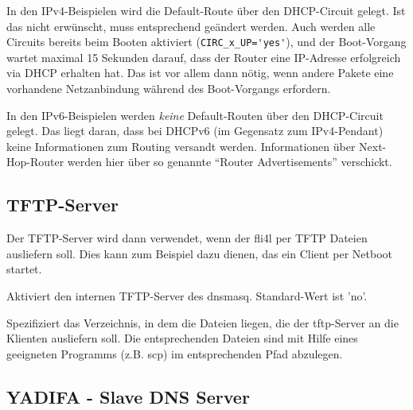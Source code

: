 In den IPv4-Beispielen wird die Default-Route über den DHCP-Circuit gelegt. Ist
das nicht erwünscht, muss  entsprechend geändert
werden. Auch werden alle Circuits bereits beim Booten aktiviert
(\verb+CIRC_x_UP='yes'+), und der Boot-Vorgang wartet maximal 15 Sekunden
darauf, dass der Router eine IP-Adresse erfolgreich via DHCP erhalten hat. Das
ist vor allem dann nötig, wenn andere Pakete eine vorhandene Netzanbindung
während des Boot-Vorgangs erfordern.

In den IPv6-Beispielen werden \emph{keine} Default-Routen über den DHCP-Circuit
gelegt. Das liegt daran, dass bei DHCPv6 (im Gegensatz zum IPv4-Pendant) keine
Informationen zum Routing versandt werden. Informationen über Next-Hop-Router
werden hier über so genannte ``Router Advertisements'' verschickt.

\subsection {TFTP-Server}

Der TFTP-Server wird dann verwendet, wenn der fli4l per TFTP Dateien ausliefern
soll. Dies kann zum Beispiel dazu dienen, das ein Client per Netboot startet.

\begin{description}

    Aktiviert den internen TFTP-Server des dnsmasq. Standard-Wert ist 'no'.


    Spezifiziert das Verzeichnis, in dem die Dateien liegen, die der
    tftp-Server an die Klienten ausliefern soll. Die entsprechenden Dateien sind
    mit Hilfe eines geeigneten Programms (z.B. scp) im entsprechenden Pfad 
    abzulegen.
    
\end{description}

\subsection {YADIFA - Slave DNS Server}


